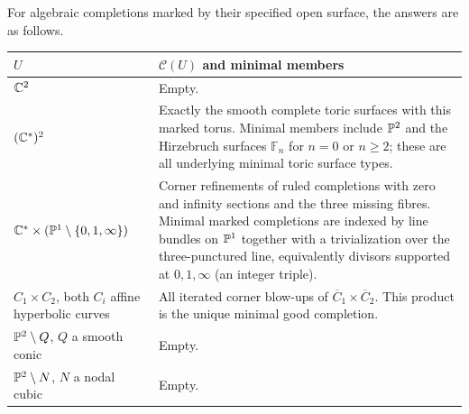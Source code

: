 \begin{example}\label{P3a-examples}
For algebraic completions marked by their specified open surface, the answers are
as follows.
\begin{center}
\begin{tabular}{p{}p{}}
\toprule
$U$ & $\mathcal C(U)$ and minimal members\\
\midrule
$\mathbb C^2$ & Empty.\\
$(\mathbb C^*)^2$ & Exactly the smooth complete toric surfaces with this marked torus.
Minimal members include $\mathbb P^2$ and the Hirzebruch surfaces $\mathbb F_n$
for $n=0$ or $n\geq2$; these are all underlying minimal toric surface types.\\
$\mathbb C^*\times(\mathbb P^1\setminus\{0,1,\infty\})$ & Corner refinements of ruled
completions with zero and infinity sections and the three missing fibres.
Minimal marked completions are indexed by line bundles on $\mathbb P^1$ together
with a trivialization over the three-punctured line, equivalently divisors
supported at $0,1,\infty$ (an integer triple).\\
$C_1\times C_2$, both $C_i$ affine hyperbolic curves & All iterated corner
blow-ups of $\overline C_1\times\overline C_2$.  This product is the unique
minimal good completion.\\
$\mathbb P^2\setminus Q$, $Q$ a smooth conic & Empty.\\
$\mathbb P^2\setminus N$, $N$ a nodal cubic & Empty.\\
\bottomrule
\end{tabular}
\end{center}
\end{example}
